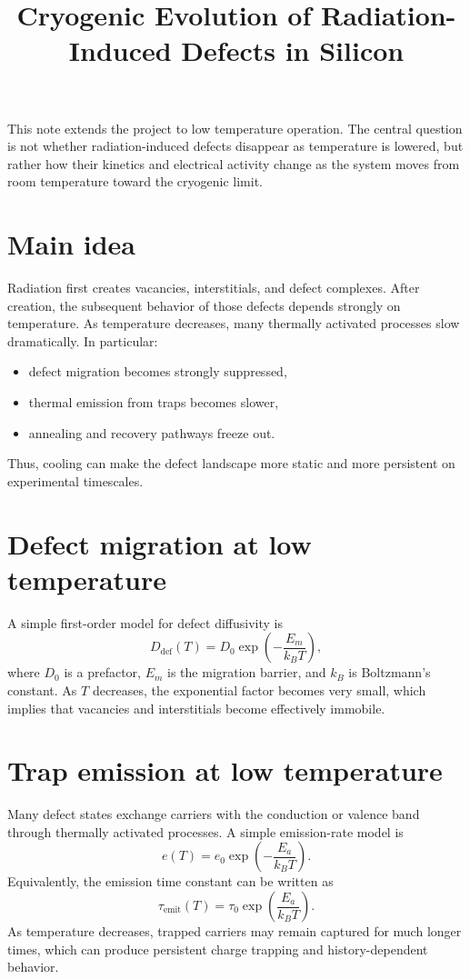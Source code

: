 \documentclass[11pt]{article}
\title{Cryogenic Evolution of Radiation-Induced Defects in Silicon}
\begin{document}
\maketitle

This note extends the project to low temperature operation. The central question is not whether radiation-induced defects disappear as temperature is lowered, but rather how their kinetics and electrical activity change as the system moves from room temperature toward the cryogenic limit.

\section*{Main idea}
Radiation first creates vacancies, interstitials, and defect complexes. After creation, the subsequent behavior of those defects depends strongly on temperature. As temperature decreases, many thermally activated processes slow dramatically. In particular:
\begin{itemize}
    \item defect migration becomes strongly suppressed,
    \item thermal emission from traps becomes slower,
    \item annealing and recovery pathways freeze out.
\end{itemize}

Thus, cooling can make the defect landscape more static and more persistent on experimental timescales.

\section*{Defect migration at low temperature}
A simple first-order model for defect diffusivity is
\[
D_{\mathrm{def}}(T) = D_0 \exp\!\left(-\frac{E_m}{k_B T}\right),
\]
where $D_0$ is a prefactor, $E_m$ is the migration barrier, and $k_B$ is Boltzmann's constant. As $T$ decreases, the exponential factor becomes very small, which implies that vacancies and interstitials become effectively immobile.

\section*{Trap emission at low temperature}
Many defect states exchange carriers with the conduction or valence band through thermally activated processes. A simple emission-rate model is
\[
e(T) = e_0 \exp\!\left(-\frac{E_a}{k_B T}\right).
\]
Equivalently, the emission time constant can be written as
\[
\tau_{\mathrm{emit}}(T) = \tau_0 \exp\!\left(\frac{E_a}{k_B T}\right).
\]
As temperature decreases, trapped carriers may remain captured for much longer times, which can produce persistent charge trapping and history-dependent behavior.
\end{document}
